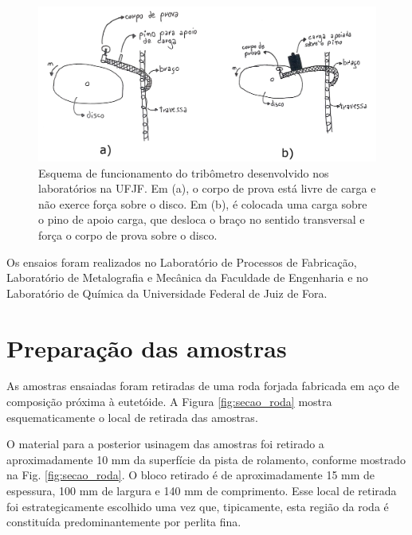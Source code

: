 \documentclass[
12pt,
openany, %
oneside, %
a4paper,			
english,			
brazil			        %
]{abntbibufjf}
\begin{document}
	\begin{figure}[H]
		\centering
		\includegraphics[width=1\textwidth]{esquema_tribometro}
		\caption{Esquema de funcionamento do tribômetro desenvolvido nos laboratórios na UFJF. Em (a), o corpo de prova está livre de carga e não exerce força sobre o disco. Em (b), é colocada uma carga sobre o pino de apoio carga, que desloca o braço no sentido transversal e força o corpo de prova sobre o disco.}
		\label{fig:esquema_tribometro}
	\end{figure}
	
	Os ensaios foram realizados no Laboratório de Processos de Fabricação, Laboratório de Metalografia e Mecânica da Faculdade de Engenharia e no Laboratório de Química da Universidade Federal de Juiz de Fora.
	
\section{Preparação das amostras}

	As amostras ensaiadas foram retiradas de uma roda forjada fabricada em aço de composição próxima à eutetóide. A Figura \ref{fig:secao_roda} mostra esquematicamente o local de retirada das amostras.
	
	O material para a posterior usinagem das amostras foi retirado a aproximadamente 10 mm da superfície da pista de rolamento, conforme mostrado na Fig. \ref{fig:secao_roda}. O bloco retirado é de aproximadamente 15 mm de espessura, 100 mm de largura e 140 mm de comprimento. Esse local de retirada foi estrategicamente escolhido uma vez que, tipicamente, esta região da roda é constituída predominantemente por perlita fina.
	
\end{document}
